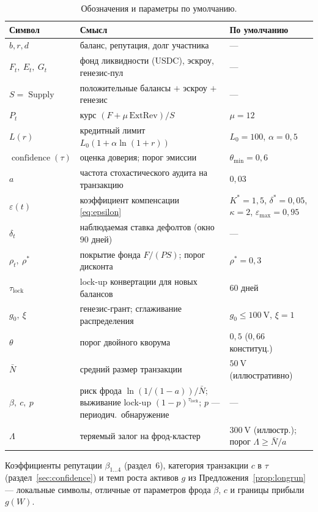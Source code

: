 \documentclass[11pt]{article}
\theoremstyle{plain}
\theoremstyle{definition}
\theoremstyle{remark}
\newcommand{\V}{\mathrm{V}}
\newcommand{\confidence}{\operatorname{confidence}}
\newcommand{\Supply}{\operatorname{Supply}}
\newcommand{\ExtRev}{\mathrm{ExtRev}}
\begin{document}
\begin{table}[h]
\centering
\small
\begin{tabular}{@{}lll@{}}
\toprule
Символ & Смысл & По умолчанию\\
\midrule
$b,r,d$ & баланс, репутация, долг участника & ---\\
$F_t,\ E_t,\ G_t$ & фонд ликвидности (USDC), эскроу, генезис-пул & ---\\
$S=\Supply$ & положительные балансы $+$ эскроу $+$ генезис & ---\\
$P_t$ & курс $(F+\mu\,\ExtRev)/S$ & $\mu=12$\\
$L(r)$ & кредитный лимит $L_0(1+\alpha\ln(1+r))$ & $L_0=100$, $\alpha=0{,}5$\\
$\confidence(\tau)$ & оценка доверия; порог эмиссии & $\theta_{\min}=0{,}6$\\
$a$ & частота стохастического аудита на транзакцию & $0{,}03$\\
$\varepsilon(t)$ & коэффициент компенсации \eqref{eq:epsilon} & $K^*{=}1{,}5$, $\delta^*{=}0{,}05$, $\kappa{=}2$, $\varepsilon_{\max}{=}0{,}95$\\
$\delta_t$ & наблюдаемая ставка дефолтов (окно $90$ дней) & ---\\
$\rho_t,\ \rho^*$ & покрытие фонда $F/(PS)$; порог дисконта & $\rho^*=0{,}3$\\
$\tau_{\mathrm{lock}}$ & lock-up конвертации для новых балансов & $60$ дней\\
$g_0,\ \xi$ & генезис-грант; сглаживание распределения & $g_0\le100~\V$, $\xi=1$\\
$\theta$ & порог двойного кворума & $0{,}5$ ($0{,}66$ конституц.)\\
$\bar N$ & средний размер транзакции & $50~\V$ (иллюстративно)\\
$\beta,\ c,\ p$ & риск фрода $\ln(1/(1-a))/\bar N$; выживание lock-up $(1-p)^{\tau_{\mathrm{lock}}}$; $p$ --- периодич.\ обнаружение & ---\\
$\Lambda$ & теряемый залог на фрод-кластер & $300~\V$ (иллюстр.); порог $\Lambda\ge\bar N/a$\\
\bottomrule
\end{tabular}
\caption{Обозначения и параметры по умолчанию.}
\label{tab:notation}
\end{table}

Коэффициенты репутации $\beta_{1\ldots4}$ (раздел~6), категория транзакции $c$ в $\tau$ (раздел~\ref{sec:confidence}) и темп роста активов $g$ из Предложения~\ref{prop:longrun} --- локальные символы, отличные от параметров фрода $\beta$, $c$ и границы прибыли $g(W)$.
\end{document}
